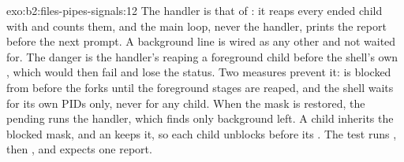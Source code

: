 \begin{solution}{exo:b2:files-pipes-signals:12}
The handler is that of : it reaps every ended child with  and counts them, and the
main loop, never the handler, prints the report before the next prompt. A background line is wired as any other and
not waited for. The danger is the handler's  reaping a foreground child before the shell's
own , which would then fail and lose the status. Two measures prevent it:  is blocked from
before the forks until the foreground stages are reaped, and the shell waits for its own PIDs only, never for any
child. When the mask is restored, the pending  runs the handler, which finds only background  left. A
child inherits the blocked mask, and an  keeps it, so each child unblocks  before its . The
test runs , then , and expects one report.
\end{solution}

